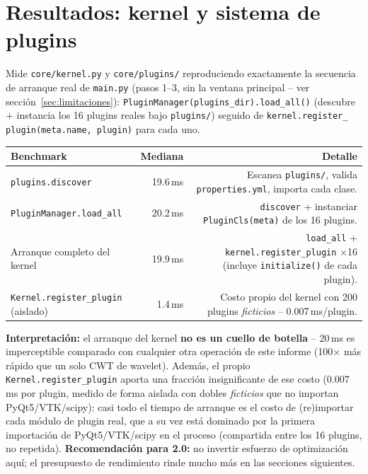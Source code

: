 \documentclass[11pt,a4paper]{article}
\begin{document}
\newpage
\section{Resultados: kernel y sistema de plugins}
\label{sec:resultados-kernel}

Mide \texttt{core/kernel.py} y \texttt{core/plugins/} reproduciendo exactamente la secuencia de arranque
real de \texttt{main.py} (pasos 1--3, sin la ventana principal -- ver
sección~\ref{sec:limitaciones}): \texttt{PluginManager(plugins\_\allowbreak dir).load\_\allowbreak all()}
(descubre + instancia los 16 plugins reales bajo \texttt{plugins/}) seguido de \texttt{kernel.register\_\allowbreak
plugin(meta.name, plugin)} para cada uno.

\begin{center}
\begin{tabular}{lrr}
\toprule
\textbf{Benchmark} & \textbf{Mediana} & \textbf{Detalle} \\
\midrule
\texttt{plugins.discover} & 19.6\,ms & Escanea \texttt{plugins/}, valida \texttt{properties.yml}, importa cada clase. \\
\texttt{PluginManager.load\_\allowbreak all} & 20.2\,ms & \texttt{discover} + instanciar \texttt{PluginCls(meta)} de los 16 plugins. \\
Arranque completo del kernel & 19.9\,ms & \texttt{load\_\allowbreak all} + \texttt{kernel.register\_\allowbreak plugin} $\times$16 (incluye \texttt{initialize()} de cada plugin). \\
\texttt{Kernel.register\_\allowbreak plugin} (aislado) & 1.4\,ms & Costo propio del kernel con 200 plugins \textit{ficticios} -- 0.007\,ms/plugin. \\
\bottomrule
\end{tabular}
\end{center}

\textbf{Interpretación:} el arranque del kernel \textbf{no es un cuello de botella} -- 20\,ms es
imperceptible comparado con cualquier otra operación de este informe (100$\times$ más rápido que un solo CWT
de wavelet). Además, el propio \texttt{Kernel.register\_\allowbreak plugin} aporta una fracción insignificante
de ese costo (0.007\,ms por plugin, medido de forma aislada con dobles \textit{ficticios} que no importan
PyQt5/VTK/scipy): casi todo el tiempo de arranque es el costo de (re)importar cada módulo de plugin real, que
a su vez está dominado por la primera importación de PyQt5/VTK/scipy en el proceso (compartida entre los 16
plugins, no repetida). \textbf{Recomendación para 2.0:} no invertir esfuerzo de optimización aquí; el
presupuesto de rendimiento rinde mucho más en las secciones siguientes.
\end{document}
